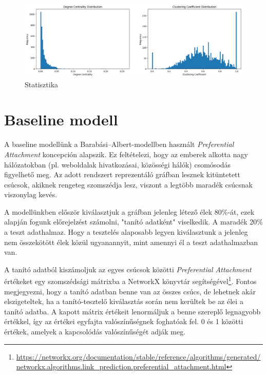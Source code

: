 \documentclass{article}
\begin{document}
		\begin{figure}[H]
			\centering
			\includegraphics[width=\linewidth]{Figures/analysis.png}
			\caption{Statisztika}
		\end{figure}
	
	\section{Baseline modell}
	
		\par A baseline modellünk a Barabási–Albert-modellben használt \textit{Preferential Attachment} koncepción alapszik. Ez feltételezi, hogy az emberek alkotta nagy hálózatokban (pl. weboldalak hivatkozásai, közösségi hálók) csomósodás figyelhető meg. Az adott rendszert reprezentáló gráfban lesznek kitüntetett csúcsok, akiknek rengeteg szomszédja lesz, viszont a legtöbb maradék csúcsnak viszonylag kevés.
		
		\par A modellünkben először kiválasztjuk a gráfban jelenleg létező élek 80\%-át, ezek alapján fogunk előrejelzést számolni, "tanító adatként" viselkedik. A maradék 20\% a teszt adathalmaz. Hogy a tesztelés alaposabb legyen kiválasztunk a jelenleg nem összekötött élek közül ugyanannyit, mint amennyi él a teszt adathalmazban van.
		
		\par A tanító adatból kiszámoljuk az egyes csúcsok közötti \textit{Preferential Attachment} értékeket egy szomszédsági mátrixba a NetworkX könyvtár segítségével\footnote{\url{https://networkx.org/documentation/stable/reference/algorithms/generated/networkx.algorithms.link_prediction.preferential_attachment.html}}. Fontos megjegyezni, hogy a tanító adatban benne van az összes csúcs, de lehetnek akár elszigeteltek, ha a tanító-tesztelő kiválasztás során nem kerültek be az élei a tanító adatba. A kapott mátrix értékeit lenormáljuk a benne szereplő legnagyobb értékkel, így az értékei egyfajta valószínűségnek foghatóak fel. 0 és 1 közötti értékek, amelyek a kapcsolódás valószínűségét adják meg.
		
\end{document}
